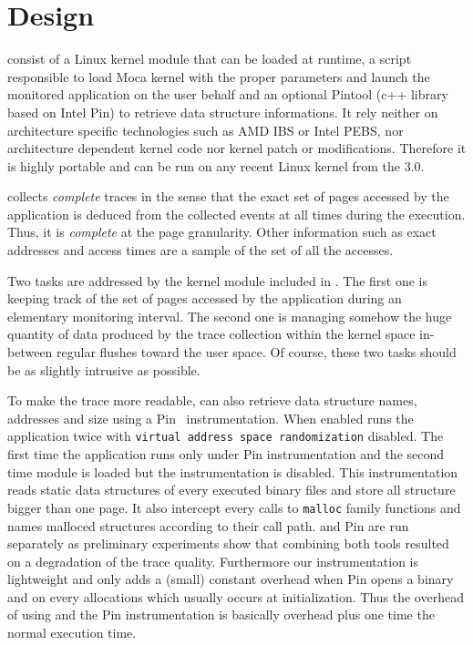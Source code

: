 \section{Design}
\label{sec:design}

\Moca consist of a Linux kernel module that can be loaded at runtime,  a script
responsible to load Moca kernel with the proper parameters and launch the
monitored application on the user behalf
and an optional Pintool (c++ library based on Intel Pin) to retrieve data
structure informations.
It rely neither on architecture specific
technologies such as AMD IBS or Intel PEBS, nor architecture dependent kernel
code nor kernel patch or modifications.
Therefore it is highly portable and can be run on any recent Linux kernel
from the $3.0$.

\Moca collects \emph{complete} traces in the sense that the exact set
of pages accessed by the application is deduced from the collected events
at all times during the execution. Thus, it is \emph{complete} at the page granularity.
Other information such as exact addresses and access times are a sample of
the set of all the accesses.

Two tasks are addressed by the kernel module included in \Moca. The first one is
keeping track of the set of pages accessed by the application during an elementary monitoring
interval. The second one is managing somehow the huge quantity of data produced
by the trace collection within the kernel space in-between regular flushes toward
the user space. Of course, these two tasks should be as slightly intrusive as possible.

To make the trace more readable, \Moca can also retrieve data structure
names, addresses and size using a Pin~\cite{Luk05Pin}
instrumentation. When enabled \Moca runs the application twice with \texttt{virtual
address space randomization} disabled. The first time the application runs only
under Pin instrumentation and the second time \Moca module is loaded but the
instrumentation is disabled. This instrumentation reads static data
structures of every executed binary files and store all structure bigger than
one page. It also intercept every calls to \texttt{malloc} family functions
and names malloced structures according to their call path.
\Moca and Pin are run separately as preliminary experiments show that combining both
tools resulted on a degradation of the trace quality. Furthermore our
instrumentation is lightweight and only  adds a (small) constant overhead when
Pin opens a binary and on every allocations which usually occurs at
initialization. Thus the overhead of using \Moca and the Pin instrumentation
is basically \Moca overhead plus one time the normal execution time.

